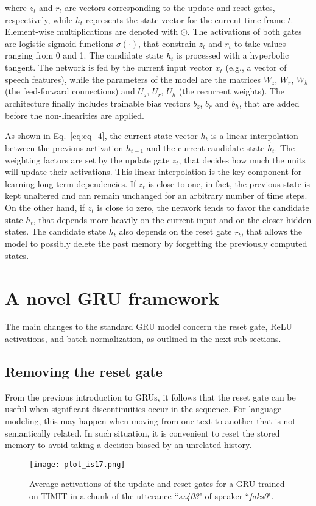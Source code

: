 \documentclass[journal]{IEEEtran}
\begin{document}
where $z_{t}$ and $r_{t}$ are vectors corresponding to the update and reset gates, respectively, while $h_{t}$ represents the state vector for the current time frame $t$.
Element-wise multiplications are denoted with $\odot$.
The activations of both gates are logistic sigmoid functions $\sigma(\cdot)$, that constrain $z_{t}$ and $r_{t}$ to take values ranging from 0 and 1. The candidate state $\widetilde{h_{t}}$ is processed with a hyperbolic tangent. 
The network is fed by the current input vector $x_{t}$ (e.g., a vector of speech features), while the parameters of the model are the matrices $W_z$, $W_r$, $W_h$ (the feed-forward connections) and $U_z$, $U_r$, $U_h$ (the recurrent weights).
The architecture finally includes trainable bias vectors $b_z$, $b_r$ and $b_h$, that are added before the non-linearities are applied. 

As shown in Eq.~\ref{eq:eq_4}, the current state vector $h_{t}$ is a linear interpolation between the previous activation $h_{t-1}$ and the current candidate state $\widetilde{h_{t}}$. The weighting factors are set by the update gate $z_{t}$, that decides how much the units will update their activations. This linear interpolation is the key component for learning long-term dependencies. If $z_{t}$ is close to one, in fact, the previous state is kept unaltered and can remain unchanged for an arbitrary number of time steps. On the other hand, if $z_{t}$ is close to zero, the network tends to favor the candidate state $\widetilde{h_{t}}$, that depends more heavily on the current input and on the closer hidden states. The candidate state $\widetilde{h_{t}}$ also depends on the reset gate $r_{t}$, that allows the model to possibly delete the past memory by forgetting the previously computed states.

\section{A novel GRU framework} \label{sec:novel}
The main changes to the standard GRU model concern the reset gate, ReLU activations, and batch normalization, as outlined in the next sub-sections. 

\subsection{Removing the reset gate}
From the previous introduction to GRUs, it follows that the reset gate can be useful when significant discontinuities occur in the sequence. For language modeling, this may happen when moving from one text to another that is not semantically related. In such situation, it is convenient to reset the stored memory to avoid taking a decision biased by an unrelated history. 
 \begin{figure}[t!]
 \centering
 \texttt{[image: plot\_is17.png]}
 \caption{Average activations of the update and reset gates for a GRU trained on TIMIT in a chunk of the utterance ``\textit{sx403}" of speaker ``\textit{faks0}".}
 \label{fig:im1}
 \end{figure}
\end{document}
